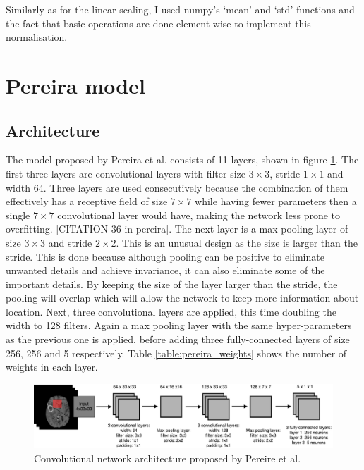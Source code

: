\documentclass[12pt,a4paper,twoside,openright]{report}
\begin{document}
Similarly as for the linear scaling, I used numpy's `mean' and `std' functions and the fact that basic operations are done element-wise to implement this normalisation.

\section{Pereira model}

\subsection{Architecture}

The model proposed by Pereira et al. \cite{pereira} consists of 11 layers, shown in figure \ref{fig:pereira_model}. The first three layers are convolutional layers with filter size $3 \times 3$, stride $1 \times 1$ and width 64. Three layers are used consecutively because the combination of them  effectively has a receptive field of size $7 \times 7$ while having fewer parameters then a single $7 \times 7$ convolutional layer would have, making the network less prone to overfitting. [CITATION 36 in pereira]. The next layer is a max pooling layer of size $3 \times 3$ and stride $2 \times 2$. This is an unusual design as the size is larger than the stride. This is done because although pooling can be positive to eliminate unwanted details and achieve invariance, it can also eliminate some of the important details. By keeping the size of the layer larger than the stride, the pooling will overlap which will allow the network to keep more information about location. Next, three convolutional layers are applied, this time doubling the width to 128 filters. Again a max pooling layer with the same hyper-parameters as the previous one is applied, before adding three fully-connected layers of size 256, 256 and 5 respectively. Table \ref{table:pereira_weights} shows the number of weights in each layer. 

\begin{figure}[h]
	\centering
	\includegraphics[width=\textwidth]{pereira_model}
	\caption{Convolutional network architecture proposed by Pereire et al.}
	\label{fig:pereira_model}
\end{figure}
\end{document}
